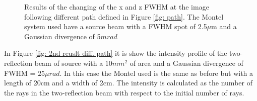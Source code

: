 \begin{figure}[]
%
\centering
%
%
\quad
%
%
\caption{Results of the changing of the x and z FWHM at the image following different path defined in Figure \ref{fig: path}. The Montel system used have a source beam with a FWHM spot of 2.5$\mu $m and a Gaussian divergence of 5$mrad $}
%
\label{fig: reuslt diff. path}
%
\end{figure}
In Figure \ref{fig: 2nd reuslt diff. path} it is show the intensity profile of the two-reflection beam of source with a $10 mm^2 $ of area and a Gaussian divergence of FWHM = $25 \mu rad $. In this case the Montel used is the same as before but with a length of 20cm and a width of 2cm.  The intensity is calculated as the number of the rays in the two-reflection beam with respect to the initial number of rays. 
